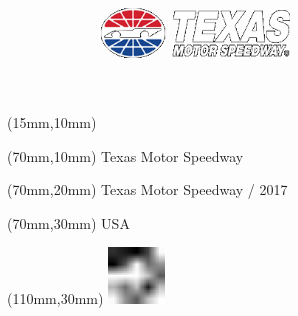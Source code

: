 \null\newpage
\begin{textblock*}{50mm}(15mm,10mm)%
\includegraphics[width=50mm]{LG/TEX.png}
\end{textblock*}
\begin{textblock*}{130mm}(70mm,10mm)%
{\fontsize{20}{20}\selectfont Texas Motor Speedway}\\
\end{textblock*}
\begin{textblock*}{120mm}(70mm,20mm)%
{\fontsize{16}{16}\selectfont Texas Motor Speedway / 2017}\\
\end{textblock*}
\begin{textblock*}{120mm}(70mm,30mm)%
{\fontsize{12}{12}\selectfont USA}
\end{textblock*}
\begin{textblock*}{30mm}(110mm,30mm)%
\centering
\includegraphics[height=15mm]{icons/fa-rotate-left.pdf}
\end{textblock*}

